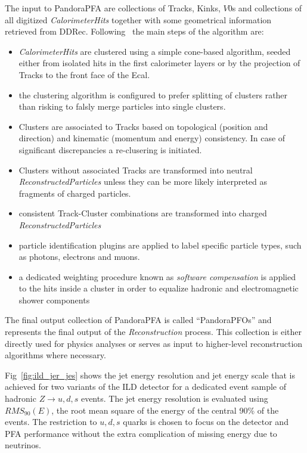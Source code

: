 The input to PandoraPFA are collections of Tracks, Kinks, $V0$s and collections of all digitized \emph{CalorimeterHits} together with
some geometrical information retrieved from DDRec.
Following~\cite{Marshall:2015rfa} the main steps of the algorithm are:

\begin{itemize}
\item \emph{CalorimeterHits} are clustered using a simple cone-based algorithm, seeded either from isolated hits in the first calorimeter
  layers or by the projection of Tracks to the front face of the Ecal.

\item the clustering algorithm is configured to prefer splitting of clusters rather than risking to falsly merge particles into single
  clusters.

\item Clusters are associated to Tracks based on topological (position and direction) and kinematic (momentum and energy) consistency.
  In case of significant discrepancies a re-clusering is initiated.

\item Clusters without associated Tracks are transformed into neutral \emph{ReconstructedParticles} unless they can be more likely
  interpreted as fragments of charged particles.
  
\item consistent Track-Cluster combinations are transformed into charged \emph{ReconstructedParticles}
  
\item particle identification plugins are applied to label specific particle types, such as photons, electrons and muons.

\item a dedicated weighting procedure known as \emph{software compensation} is applied to the hits inside a cluster in order
  to equalize hadronic and electromagnetic shower components 
  
\end{itemize}


The final output collection of PandoraPFA is called ``PandoraPFOs'' and represents the final output of the \emph{Reconstruction}
process. This collection is either directly used for physics analyses or serves as input to higher-level reconstruction
algorithms where necessary.

Fig~\ref{fig:ild_jer_jes} shows the jet energy resolution and jet energy scale that is achieved for two variants of the ILD detector
for a dedicated event sample of hadronic $Z\rightarrow u,d,s$ events.
The jet energy resolution is evaluated using $RMS_{90}(E)$, the root mean square of the energy of the central 90\% of the events.
The restriction to $u,d,s$ quarks is chosen to focus on  the detector and PFA performance without the extra complication of missing
energy due to neutrinos.


